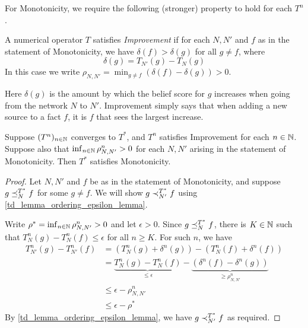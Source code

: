 For Monotonicity, we require the following (stronger) property to hold for each
$T^n$.

\begin{definition}

    A numerical operator $T$ satisfies \emph{Improvement} if for each $N, N'$
    and $f$ as in the statement of Monotonicity, we have $\delta(f) >
    \delta(g)$ for all $g \ne f$, where
    \[
        \delta(g) = T_{N'}(g) - T_N(g)
    \]
    In this case we write $\rho_{N,N'} = \min_{g \ne f}{(\delta(f) -
    \delta(g))} > 0$.

\end{definition}

Here $\delta(g)$ is the amount by which the belief score for $g$ increases when
going from the network $N$ to $N'$. Improvement simply says that when adding a
new source to a fact $f$, it is $f$ that sees the largest increase.

\begin{proposition}

    Suppose $(T^n)_{n \in \mathbb{N}}$ converges to $T^*$, and $T^n$ satisfies
    Improvement for each $n \in \mathbb{N}$. Suppose also that $\inf_{n \in
    \mathbb{N}}{\rho_{N,N'}^n} > 0$ for each $N, N'$ arising in the statement of
    Monotonicity. Then $T^*$ satisfies Monotonicity.

\end{proposition}

\begin{proof}

    Let $N, N'$ and $f$ be as in the statement of Monotonicity, and suppose $g
    \preceq_N^{T^*} f$ for some $g \ne f$. We will show $g \prec_{N'}^{T^*} f$
    using \cref{td_lemma_ordering_epsilon_lemma}.

    Write $\rho^* = \inf_{n \in \mathbb{N}}{\rho_{N,N'}^n} > 0$ and let $\epsilon >
    0$. Since $g \preceq_N^{T^*} f$, there is $K \in \mathbb{N}$ such that $T^n_N(g) -
    T^n_N(f) \le \epsilon$ for all $n \ge K$. For such $n$, we have
    \begin{align*}
        T_{N'}^n(g) - T_{N'}^n(f)
        &= (T_N^n(g) + \delta^n(g)) - (T_N^n(f) + \delta^n(f)) \\
        &=
            \underbrace{T_N^n(g) - T_N^n(f)}_{\le \epsilon}
            -
            \underbrace{(\delta^n(f) - \delta^n(g))}_{\ge \rho_{N,N'}^n}
            \\
        &\le \epsilon - \rho_{N,N'}^n \\
        &\le \epsilon - \rho^*
    \end{align*}
    By \cref{td_lemma_ordering_epsilon_lemma}, we have $g \prec_{N'}^{T^*} f$
    as required.
\end{proof}

